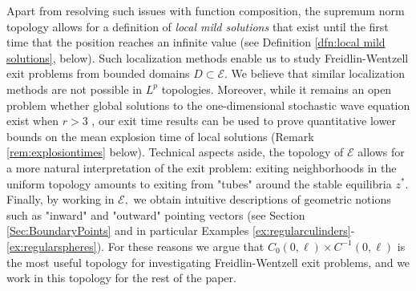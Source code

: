 \documentclass[10pt, reqno]{amsart}
\newcommand{\e}{\mathcal{E}}
\theoremstyle{definition}
\numberwithin{lem}{section}
\numberwithin{cor}{section}
\numberwithin{prop}{section}
\numberwithin{thm}{section}
\numberwithin{dfn}{section}
\begin{document}
    Apart from resolving such issues with function composition, the supremum norm topology allows for a definition of \textit{local mild solutions} that exist until the first time that the position reaches an infinite value (see Definition \ref{dfn:local mild solutions}, below). Such localization methods enable us to study Freidlin-Wentzell exit problems from bounded domains $D \subset \mathcal{E}$. We believe that similar localization methods are not possible in $L^p$ topologies. Moreover, while it remains an open problem whether global solutions to the one-dimensional stochastic wave equation exist when $r>3$ \cite{millet2001nonlinear}, our exit time results can be used to prove quantitative lower bounds on the mean explosion time of local solutions (Remark \ref{rem:explosiontimes} below). Technical aspects aside, the topology of $\e$ allows for a more natural interpretation of the exit problem: exiting neighborhoods in the uniform topology amounts to exiting from "tubes" around the stable equilibria $z^*.$ Finally, by working in $\e,$ we obtain intuitive  descriptions of geometric notions such as "inward" and "outward" pointing vectors (see Section \ref{Sec:BoundaryPoints} and in particular Examples \ref{ex:regularculinders}- \ref{ex:regularspheres}). For these reasons we argue that $C_0(0,\ell)\times C^{-1}(0,\ell)$ is the most useful topology for investigating Freidlin-Wentzell exit problems, and we work in this topology for the rest of the paper.
\end{document}
